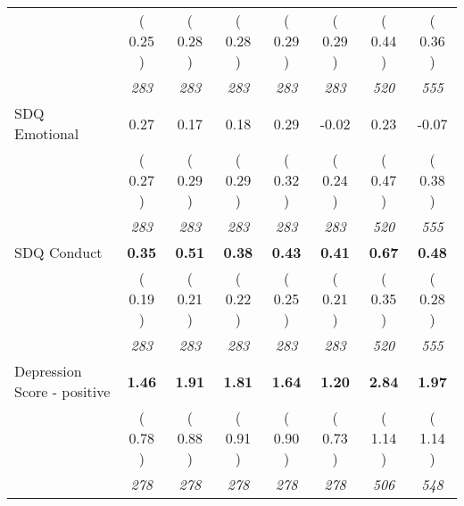 \begin{tabular}{l c c c c c c c}
& (     0.25 ) & (     0.28 ) & (     0.28 ) & (     0.29 ) & (     0.29 ) & (     0.44 ) & (     0.36 ) \\
& \textit{ 283 } & \textit{ 283 } & \textit{ 283 } & \textit{ 283 } & \textit{ 283 } & \textit{ 520 } & \textit{ 555 } \\
SDQ Emotional &      0.27 &      0.17 &      0.18 &      0.29 &     -0.02 &      0.23 &     -0.07 \\
& (     0.27 ) & (     0.29 ) & (     0.29 ) & (     0.32 ) & (     0.24 ) & (     0.47 ) & (     0.38 ) \\
& \textit{ 283 } & \textit{ 283 } & \textit{ 283 } & \textit{ 283 } & \textit{ 283 } & \textit{ 520 } & \textit{ 555 } \\
SDQ Conduct & \textbf{      0.35 } & \textbf{      0.51 } & \textbf{      0.38 } & \textbf{     0.43} & \textbf{     0.41} & \textbf{      0.67 } & \textbf{      0.48 } \\
& (     0.19 ) & (     0.21 ) & (     0.22 ) & (     0.25 ) & (     0.21 ) & (     0.35 ) & (     0.28 ) \\
& \textit{ 283 } & \textit{ 283 } & \textit{ 283 } & \textit{ 283 } & \textit{ 283 } & \textit{ 520 } & \textit{ 555 } \\
Depression Score - positive & \textbf{      1.46 } & \textbf{      1.91 } & \textbf{      1.81 } & \textbf{     1.64} & \textbf{     1.20} & \textbf{      2.84 } & \textbf{      1.97 } \\
& (     0.78 ) & (     0.88 ) & (     0.91 ) & (     0.90 ) & (     0.73 ) & (     1.14 ) & (     1.14 ) \\
& \textit{ 278 } & \textit{ 278 } & \textit{ 278 } & \textit{ 278 } & \textit{ 278 } & \textit{ 506 } & \textit{ 548 } \\
\bottomrule
\end{tabular}
